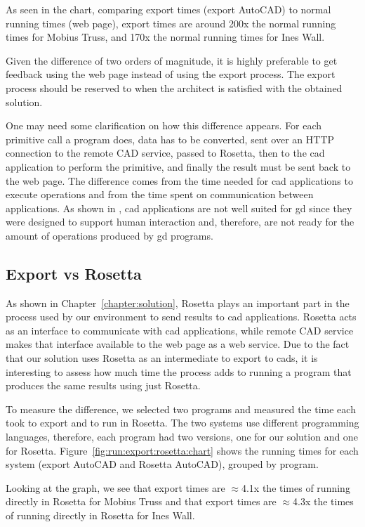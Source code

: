 As seen in the chart, comparing export times (export AutoCAD) to normal running times (web page), export times are around 200x the normal running times for Mobius Truss, and 170x the normal running times for Ines Wall.

Given the difference of two orders of magnitude, it is highly preferable to get feedback using the web page instead of using the export process.
The export process should be reserved to when the architect is satisfied with the obtained solution.

One may need some clarification on how this difference appears.
For each primitive call a program does, data has to be converted, sent over an HTTP connection to the remote CAD service, passed to Rosetta, then to the \gls{cad} application to perform the primitive, and finally the result must be sent back to the web page.
The difference comes from the time needed for \gls{cad} applications to execute operations and from the time spent on communication between applications.
As shown in \cite{Leitao2014illustrated}, \gls{cad} applications are not well suited for \gls{gd} since they were designed to support human interaction and, therefore, are not ready for the amount of operations produced by \gls{gd} programs.


\subsection{Export vs Rosetta}
As shown in Chapter~\ref{chapter:solution}, Rosetta plays an important part in the process used by our environment to send results to \gls{cad} applications.
Rosetta acts as an interface to communicate with \gls{cad} applications, while remote CAD service makes that interface available to the web page as a web service.
Due to the fact that our solution uses Rosetta as an intermediate to export to \glspl{cad}, it is interesting to assess how much time the process adds to running a program that produces the same results using just Rosetta.

To measure the difference, we selected two programs and measured the time each took to export and to run in Rosetta.
The two systems use different programming languages, therefore, each program had two versions, one for our solution and one for Rosetta.
Figure~\ref{fig:run:export:rosetta:chart} shows the running times for each system (export AutoCAD and Rosetta AutoCAD), grouped by program.

Looking at the graph, we see that export times are $\approx$4.1x the times of running directly in Rosetta for Mobius Truss and that export times are $\approx$4.3x the times of running directly in Rosetta for Ines Wall.

